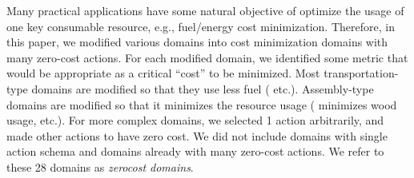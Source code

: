 
Many practical applications have some natural
objective of optimize the usage of one key consumable resource, e.g., fuel/energy cost minimization.
Therefore, in this paper, we modified various domains
into cost minimization domains with many zero-cost actions.
For each modified domain, we identified some metric that would be appropriate as a 
critical ``cost'' to be minimized.
Most transportation-type domains are modified so that they use less
fuel ( etc.). Assembly-type domains are modified so
that it minimizes the resource usage
( minimizes wood usage, etc.).
For more complex domains, we selected 1 action
arbitrarily, and made other actions to have zero cost. We did not
include domains with single action schema and domains already with many
zero-cost actions.
We refer to these 28 domains as \emph{zerocost domains}.


